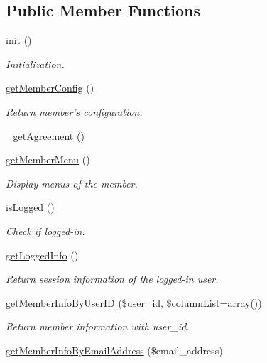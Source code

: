 \subsection*{Public Member Functions}
\begin{DoxyCompactItemize}
\item 
\hyperlink{classmemberModel_ae809c0b0f1c10e0352ad65e7df2a1ac9}{init} ()
\begin{DoxyCompactList}\small\item\em Initialization. \end{DoxyCompactList}\item 
\hyperlink{classmemberModel_a063f34e0a57f8e1c2737318ecd6db8c7}{get\+Member\+Config} ()
\begin{DoxyCompactList}\small\item\em Return member's configuration. \end{DoxyCompactList}\item 
\hyperlink{classmemberModel_a77fb03f9f26568731dfad78b0b1572dd}{\+\_\+get\+Agreement} ()
\item 
\hyperlink{classmemberModel_acd26b1539d27466b84d16d2be10f82cd}{get\+Member\+Menu} ()
\begin{DoxyCompactList}\small\item\em Display menus of the member. \end{DoxyCompactList}\item 
\hyperlink{classmemberModel_a1cae2bd4d961fc6412281111a1565a3d}{is\+Logged} ()
\begin{DoxyCompactList}\small\item\em Check if logged-\/in. \end{DoxyCompactList}\item 
\hyperlink{classmemberModel_a80179b6ef63e1917514c098df24c6e93}{get\+Logged\+Info} ()
\begin{DoxyCompactList}\small\item\em Return session information of the logged-\/in user. \end{DoxyCompactList}\item 
\hyperlink{classmemberModel_a51229368446fed60d67d3349a0ac305c}{get\+Member\+Info\+By\+User\+I\+D} (\$user\+\_\+id, \$column\+List=array())
\begin{DoxyCompactList}\small\item\em Return member information with user\+\_\+id. \end{DoxyCompactList}\item 
\hyperlink{classmemberModel_a24c934744cc3cc540533312463a63026}{get\+Member\+Info\+By\+Email\+Address} (\$email\+\_\+address)

\end{DoxyCompactItemize}
